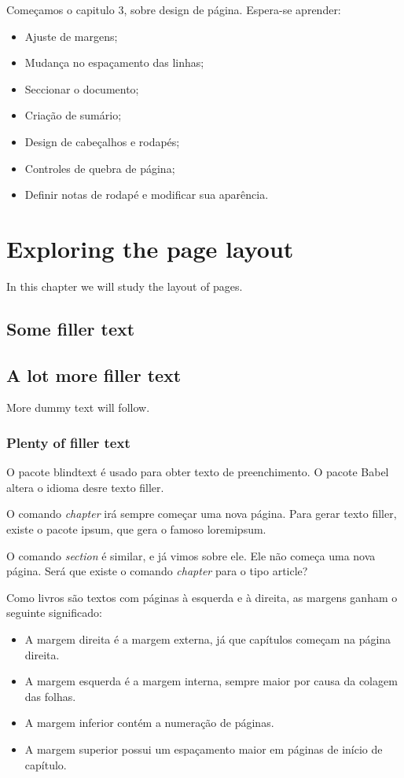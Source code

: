\documentclass{a4paper, 12pts}{book}
\begin{document}
Começamos o capitulo 3, sobre design de página.
Espera-se aprender:
\begin{itemize}
    \item Ajuste de margens;
    \item Mudança no espaçamento das linhas;
    \item Seccionar o documento;
    \item Criação de sumário;
    \item Design de cabeçalhos e rodapés;
    \item Controles de quebra de página;
    \item Definir notas de rodapé e modificar sua aparência.
\end{itemize}

\chapter{Exploring the page layout}
In this chapter we will study the layout of pages.

\section{Some filler text}
\blindtext
\section{A lot more filler text}
More dummy text will follow.
\subsection{Plenty of filler text}
\blindtext[10]

O pacote blindtext é usado para obter texto de preenchimento.
O pacote Babel altera o idioma desre texto filler.

O comando \emph{chapter} irá sempre começar uma nova página.
Para gerar texto filler, existe o pacote ipsum, que gera o famoso loremipsum.

O comando \emph{section} é similar, e já vimos sobre ele. Ele não começa uma nova página. Será que existe o comando \emph{chapter} para o tipo article?

Como livros são textos com páginas à esquerda e à direita, as margens ganham o seguinte significado:

\begin{itemize}
    \item A margem direita é a margem externa, já que capítulos começam na página direita.
    \item A margem esquerda é a margem interna, sempre maior por causa da colagem das folhas.
    \item A margem inferior contém a numeração de páginas.
    \item A margem superior possui um espaçamento maior em páginas de início de capítulo.
\end{itemize}
\end{document}
